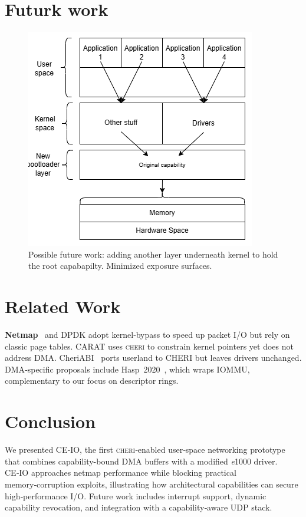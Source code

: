 \documentclass[sigconf]{acmart}
\newcommand{\cheri}{\textsc{cheri}\xspace}
\newcommand{\e}{\textit{e}1000\xspace}
\begin{document}
\section{Futurk work}
\begin{figure}[t]
    \centering
    \includegraphics[width=0.9\columnwidth]{figures/future-work.drawio.png}
    \caption{Possible future work: adding another layer underneath kernel to hold the root capabapilty. Minimized exposure surfaces.}
    \label{fig:flow}
\end{figure}


\section{Related Work}
\label{sec:related}
\textbf{Netmap} \cite{rizzo2012netmap} and DPDK adopt kernel‑bypass to speed up packet I/O but rely on classic page tables. CARAT \cite{carat2023} uses \cheri to constrain kernel pointers yet does not address DMA. CheriABI \cite{watts2019cheriabi} ports userland to CHERI but leaves drivers unchanged. DMA‑specific proposals include Hasp 2020 \cite{cheridma2020}, which wraps IOMMU, complementary to our focus on descriptor rings.

\section{Conclusion}
\label{sec:conclusion}
We presented CE‑IO, the first \cheri‑enabled user‑space networking prototype that combines capability-bound DMA buffers with a modified \e driver. CE‑IO approaches netmap performance while blocking practical memory‑corruption exploits, illustrating how architectural capabilities can secure high‑performance I/O. Future work includes interrupt support, dynamic capability revocation, and integration with a capability‑aware UDP stack.
\end{document}

